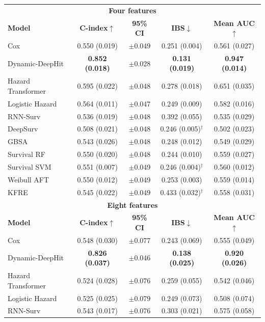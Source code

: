 \begin{table}[h!]
\centering
\footnotesize
\setlength{\tabcolsep}{3pt}
\begin{tabular}{@{}lcccc@{}}
\toprule
\multicolumn{5}{c}{\textbf{Four features}} \\
\textbf{Model} & \textbf{C-index}$\uparrow$ & \textbf{95\% CI} & \textbf{IBS}$\downarrow$ & \textbf{Mean AUC}$\uparrow$ \\
\midrule
Cox & 0.550 (0.019) & $\pm$0.049 & 0.251 (0.004) & 0.561 (0.027) \\
Dynamic-DeepHit & \textbf{0.852 (0.018)} & $\pm$0.028 & \textbf{0.131 (0.019)} & \textbf{0.947 (0.014)} \\
Hazard Transformer & 0.595 (0.022) & $\pm$0.048 & 0.278 (0.018) & 0.651 (0.035) \\
Logistic Hazard & 0.564 (0.011) & $\pm$0.047 & 0.249 (0.009) & 0.582 (0.016) \\
RNN-Surv & 0.536 (0.019) & $\pm$0.048 & 0.392 (0.055) & 0.535 (0.029) \\
DeepSurv & 0.508 (0.021) & $\pm$0.048 & 0.246 (0.005)$^{\dagger}$ & 0.502 (0.023) \\
GBSA & 0.543 (0.026) & $\pm$0.048 & 0.248 (0.012) & 0.549 (0.029) \\
Survival RF & 0.550 (0.020) & $\pm$0.048 & 0.244 (0.010) & 0.559 (0.027) \\
Survival SVM & 0.551 (0.007) & $\pm$0.049 & 0.246 (0.004)$^{\dagger}$ & 0.560 (0.012) \\
Weibull AFT & 0.550 (0.012) & $\pm$0.049 & 0.253 (0.003) & 0.559 (0.014) \\
KFRE & 0.545 (0.022) & $\pm$0.049 & 0.433 (0.032)$^{\dagger}$ & 0.558 (0.031) \\
\midrule
\multicolumn{5}{c}{\textbf{Eight features}} \\
\textbf{Model} & \textbf{C-index}$\uparrow$ & \textbf{95\% CI} & \textbf{IBS}$\downarrow$ & \textbf{Mean AUC}$\uparrow$ \\
\midrule
Cox & 0.548 (0.030) & $\pm$0.077 & 0.243 (0.069) & 0.555 (0.049) \\
Dynamic-DeepHit & \textbf{0.826 (0.037)} & $\pm$0.046 & \textbf{0.138 (0.025)} & \textbf{0.920 (0.026)} \\
Hazard Transformer & 0.524 (0.028) & $\pm$0.076 & 0.259 (0.055) & 0.542 (0.046) \\
Logistic Hazard & 0.525 (0.025) & $\pm$0.079 & 0.249 (0.073) & 0.508 (0.074) \\
RNN-Surv & 0.543 (0.017) & $\pm$0.076 & 0.303 (0.021) & 0.575 (0.058) \\

\end{tabular}
\end{table}
